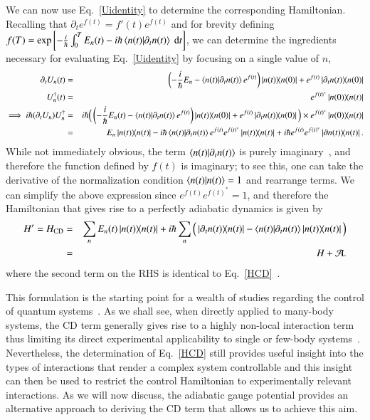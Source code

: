 We can now use Eq.~\eqref{Uidentity} to determine the corresponding Hamiltonian. Recalling that $\partial_t e^{f(t)} = f'(t) e^{f(t)}$ and for brevity defining $f(T)=\text{exp}\left[ - \frac{i}{\hbar} \int_0^T E_n(t) - i\hbar \braket{n(t)}{\partial_t n(t)}~\mathrm dt \right]$, we can determine the ingredients necessary for evaluating Eq.~\eqref{Uidentity} by focusing on a single value of $n$,
\begin{eqnarray}
\partial_t U_n(t) &=& \left( -\frac{i}{\hbar} E_n - \braket{n(t)}{\partial_t n(t)} e^{f(t)} \right) \ketbra{n(t)}{n(0)} + e^{f(t)}\ketbra{\partial_t n(t)}{n(0)} \nonumber \\
U^{\dagger}_n (t) &= & e^{f(t)^*}\ketbra{n(0)}{n(t)} \nonumber \\
\implies i\hbar(\partial_t U_n)U_n^\dagger &=& i\hbar \Big(  \left( -\frac{i}{\hbar} E_n(t) - \braket{n(t)}{\partial_t n(t)} e^{f(t)} \right) \ketbra{n(t)}{n(0)} + e^{f(t)}\ketbra{\partial_t n(t)}{n(0)}   \Big) \times e^{f(t)^*}\ketbra{n(0)}{n(t)} \nonumber \\
&=& E_n \ketbra{n(t)}{n(t)} - i\hbar \braket{n(t)}{\partial_t n(t)}e^{f(t)}e^{f(t)^*} \ketbra{n(t)}{n(t)} + i\hbar e^{f(t)}e^{f(t)^*} \ketbra{\partial n(t)}{n(t)}.
\end{eqnarray}
While not immediately obvious, the term $\braket{n(t)}{\partial_t n(t)}$ is purely imaginary~\cite{BudichReview}, and therefore the function defined by $f(t)$ is imaginary; to see this, one can take the derivative of the normalization condition $\bra{n(t)}\ket{n(t)}=1$ and rearrange terms. We can simplify the above expression since $e^{f(t)}e^{f(t)^*}=1$, and therefore the Hamiltonian that gives rise to a perfectly adiabatic dynamics is given by
\begin{eqnarray}
\label{eq:IE}
H' = H_\text{CD} &= & \sum_n E_n(t) \ketbra{n(t)}{n(t)} + i\hbar \sum_n \Big( \ketbra{\partial_t n(t)}{n(t)} - \braket{n(t)}{\partial_t n(t)} \ketbra{n(t)}{n(t)} \Big) \nonumber\\
& =& H+ \mathcal{A}.
\end{eqnarray}
where the second term on the RHS is identical to Eq.~\eqref{HCD}~\cite{Berry2009}. 

This formulation is the starting point for a wealth of studies regarding the control of quantum systems~\cite{STAreview}. As we shall see, when directly applied to many-body systems, the CD term generally gives rise to a highly non-local interaction term thus limiting its direct experimental applicability to single or few-body systems~\cite{delCampo2012Assisted, CampbellPRL}. Nevertheless, the determination of Eq.~\eqref{HCD} still provides useful insight into the types of interactions that render a complex system controllable and this insight can then be used to restrict the control Hamiltonian to experimentally relevant interactions. As we will now discuss, the adiabatic gauge potential provides an alternative approach to deriving the CD term that allows us to achieve this aim.

